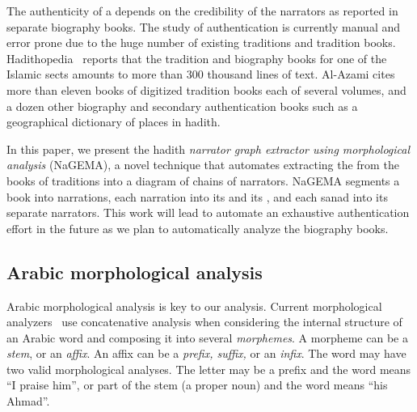 \documentclass{llncs}
\newcommand{\noArRL}[1]{\arabfalse\RL{#1}\arabtrue}
\begin{document}
The authenticity of a \noArRL{.hady_t} depends on 
the credibility of the narrators as reported in 
separate biography books. 
The study of \noArRL{.hady_t} authentication is 
currently manual and error prone due to the huge number
of existing traditions and tradition books. 
Hadithopedia~\cite{Hadithopaedia:08}
reports that the tradition and biography
books for one of the Islamic sects amounts to more than 
300 thousand lines of text. 
Al-Azami\cite{Al-Azami-91} cites more than eleven books
of digitized tradition books each of several volumes, and a dozen
other biography and secondary authentication books such
as a geographical dictionary of places in hadith. 

\novocalize

\transfalse
\begin{figure}[tb]
\end{figure}
\transtrue
\vocalize

In this paper, we present the hadith {\em narrator graph
extractor using morphological analysis} (NaGEMA), 
a novel technique that automates
extracting the \noArRL{sanad} from the books of traditions 
into a diagram of chains of narrators. NaGEMA segments
a book into narrations, each narration into its \noArRL{matn} 
and its \noArRL{sanad}, 
and each sanad into its separate narrators. 
This work will lead to 
automate an exhaustive \noArRL{.hady_t} authentication 
effort in the future as we plan to 
automatically analyze the biography books.


\subsection{ Arabic morphological analysis}
Arabic morphological analysis is key to our analysis. 
Current morphological analyzers~\cite{Sughaiyer:04}
use concatenative analysis when
considering the internal structure 
of an Arabic word and
composing it into several {\em morphemes}. 
A morpheme can be a {\em stem}, or an {\em affix}.
An affix can be a {\em prefix, suffix, } or an {\em infix}.
\vocalize
The word 
may have two valid morphological analyses. 
The letter  may be a prefix and the word means 
``I praise him'', or 
part of the stem  (a proper noun)
and the word means ``his Ahmad''.
\end{document}
